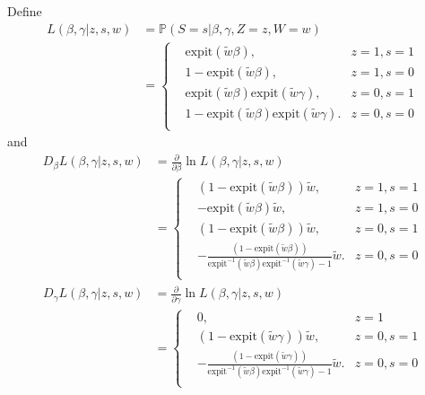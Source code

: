 \documentclass[article]{jss}
\def\expit{\mathrm{expit}}
\begin{document}
Define
\begin{equation}
  \begin{aligned}
  L(\beta,\gamma|z,s,w) &= \mathbb{P}(S=s|\beta,\gamma,Z=z,W=w) \\
  &=\left\{
  \begin{aligned}
    &\expit(\widetilde{w}\beta), &z=1,s=1 \\
    &1-\expit(\widetilde{w}\beta),&z=1,s=0 \\
    &\expit(\widetilde{w}\beta)\expit(\widetilde{w}\gamma),&z=0,s=1 \\
    &1-\expit(\widetilde{w}\beta)\expit(\widetilde{w}\gamma).&z=0,s=0\\
  \end{aligned}
  \right.
  \end{aligned}
\end{equation}
and
\begin{equation}
  \begin{aligned}
    D_\beta L(\beta,\gamma|z,s,w) &= \frac{\partial}{\partial\beta}\ln L(\beta,\gamma|z,s,w) \\
    &=\left\{
    \begin{aligned}
      &(1-\expit(\widetilde{w}\beta))\widetilde{w}, &z=1,s=1 \\
      &-\expit(\widetilde{w}\beta)\widetilde{w},&z=1,s=0 \\
      &(1-\expit(\widetilde{w}\beta))\widetilde{w},&z=0,s=1 \\
      &-\frac{(1-\expit(\widetilde{w}\beta))}{\expit^{-1}(\widetilde{w}\beta)\expit^{-1}(\widetilde{w}\gamma)-1}\widetilde{w}.&z=0,s=0\\
    \end{aligned}
    \right.
    \end{aligned}
\end{equation}
\begin{equation}
  \begin{aligned}
    D_\gamma L(\beta,\gamma|z,s,w) &= \frac{\partial}{\partial\gamma}\ln L(\beta,\gamma|z,s,w) \\
    &=\left\{
    \begin{aligned}
      &0, &z=1\\
      &(1-\expit(\widetilde{w}\gamma))\widetilde{w},&z=0,s=1 \\
      &-\frac{(1-\expit(\widetilde{w}\gamma))}{\expit^{-1}(\widetilde{w}\beta)\expit^{-1}(\widetilde{w}\gamma)-1}\widetilde{w}.&z=0,s=0\\
    \end{aligned}
    \right.
    \end{aligned}
\end{equation}
\end{document}

